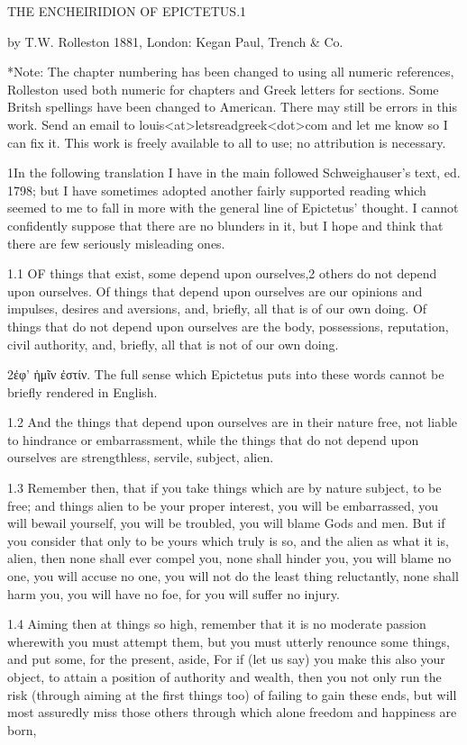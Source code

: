 THE ENCHEIRIDION OF EPICTETUS.1

by T.W. Rolleston 1881, London: Kegan Paul, Trench & Co.

*Note: The chapter numbering has been changed to using all numeric references, Rolleston used both numeric for chapters and Greek letters for sections. Some Britsh spellings have been changed to American. There may still be errors in this work. Send an email to louis<at>letsreadgreek<dot>com and let me know so I can fix it. This work is freely available to all to use; no attribution is necessary.

 

 1In the following translation I have in the main followed Schweighauser’s text, ed. 1798; but I have sometimes adopted another fairly supported reading which seemed to me to fall in more with the general line of Epictetus’ thought. I cannot confidently suppose that there are no blunders in it, but I hope and think that there are few seriously misleading ones.

  1.1   OF things that exist, some depend upon ourselves,2 others do not depend upon ourselves. Of things that depend upon ourselves are our opinions and impulses, desires and aversions, and, briefly, all that is of our own doing. Of things that do not depend upon ourselves are the body, possessions, reputation, civil authority, and, briefly, all that is not of our own doing.

  2ἐφ' ἡμῖν ἐστίν. The full sense which Epictetus puts into these words cannot be briefly rendered in English.

  1.2    And the things that depend upon ourselves are in their nature free, not liable to hindrance or embarrassment, while the things that do not depend upon ourselves are strengthless, servile, subject, alien.

  1.3   Remember then, that if you take things which are by nature subject, to be free; and things alien to be your proper interest, you will be embarrassed, you will bewail yourself, you will be troubled, you will blame Gods and men. But if you consider that only to be yours which truly is so, and the alien as what it is, alien, then none shall ever compel you, none shall hinder you, you will blame no one, you will accuse no one, you will not do the least thing reluctantly, none shall harm you, you will have no foe, for you will suffer no injury.

  1.4    Aiming then at things so high, remember that it is no moderate passion wherewith you must attempt them, but you must utterly renounce some things, and put some, for the present, aside, For if (let us say) you make this also your object, to attain a position of authority and wealth, then you not only run the risk (through aiming at the first things too) of failing to gain these ends, but will most assuredly miss those others through which alone freedom and happiness are born,

